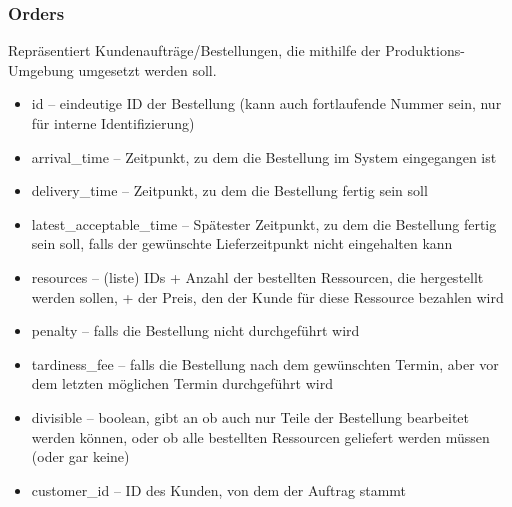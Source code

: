 \documentclass[a4paper,12pt,twoside]{scrreprt}
\begin{document}
\subsubsection*{Orders}
Repräsentiert Kundenaufträge/Bestellungen, die mithilfe der Produktions-Umgebung umgesetzt werden soll.
\begin{itemize}
	\item id – eindeutige ID der Bestellung (kann auch fortlaufende Nummer sein, nur für interne Identifizierung)
	\item arrival\_time – Zeitpunkt, zu dem die Bestellung im System eingegangen ist
	\item delivery\_time – Zeitpunkt, zu dem die Bestellung fertig sein soll
	\item latest\_acceptable\_time – Spätester Zeitpunkt, zu dem die Bestellung fertig sein soll, 
	falls der gewünschte Lieferzeitpunkt nicht eingehalten kann
	\item resources – (liste) IDs + Anzahl der bestellten Ressourcen, die hergestellt werden sollen, + der Preis, den der Kunde für diese Ressource bezahlen wird
	\item penalty – falls die Bestellung nicht durchgeführt wird
	\item tardiness\_fee – falls die Bestellung nach dem gewünschten Termin, aber vor dem letzten möglichen Termin durchgeführt wird
	\item divisible – boolean, gibt an ob auch nur Teile der Bestellung bearbeitet werden können, oder ob alle bestellten Ressourcen geliefert werden müssen (oder gar keine)
	\item customer\_id – ID des Kunden, von dem der Auftrag stammt
\end{itemize}
\end{document}
